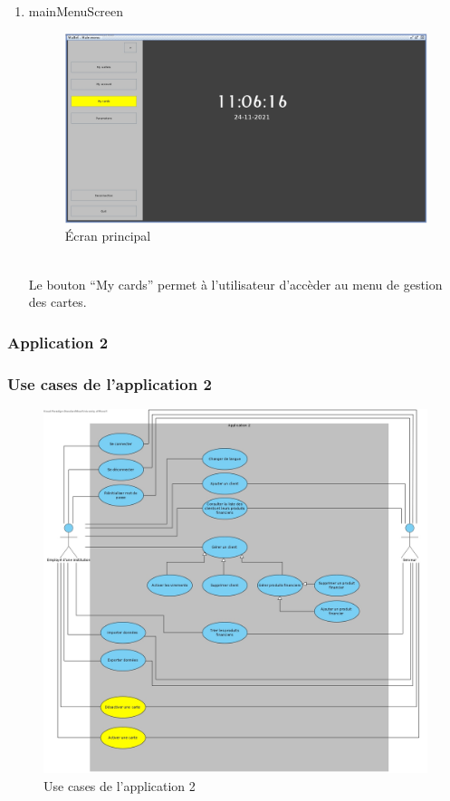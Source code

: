 \documentclass[../rapport.tex]{subfiles}
\begin{document}
\begin{enumerate}
	\item{mainMenuScreen}\\
	\begin{figure}[h!]
		\centering\includegraphics[scale=0.15]{ressources/photos_diagrammes/extensionTheo/gui1/mainMenu.jpg}
		\caption{Écran principal}
	\end{figure}\\

Le bouton ``My cards'' permet à l'utilisateur d'accèder au menu de gestion des cartes.

\end{enumerate}

\subsubsection{Application 2}
\subsubsection{Use cases de l'application 2}
	\begin{figure}[h!]
		\centering\includegraphics[scale=0.15]{ressources/photos_diagrammes/extensionTheo/diagrams2/useCases2.jpg}
		\caption{Use cases de l'application 2}
	\end{figure}
\end{document}
